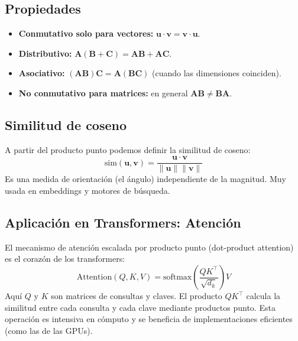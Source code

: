 \documentclass[12pt,a4paper,openany,oneside]{book}
\begin{document}
\begin{center}
\end{center}

\subsection{Propiedades}
\begin{itemize}
    \item \textbf{Conmutativo solo para vectores:} $\mathbf{u}\cdot\mathbf{v} = \mathbf{v}\cdot\mathbf{u}$.
    \item \textbf{Distributivo:} $\mathbf{A}(\mathbf{B}+\mathbf{C}) = \mathbf{A}\mathbf{B} + \mathbf{A}\mathbf{C}$.
    \item \textbf{Asociativo:} $(\mathbf{A}\mathbf{B})\mathbf{C} = \mathbf{A}(\mathbf{B}\mathbf{C})$ (cuando las dimensiones coinciden).
    \item \textbf{No conmutativo para matrices:} en general $\mathbf{A}\mathbf{B} \neq \mathbf{B}\mathbf{A}$.
\end{itemize}

\subsection{Similitud de coseno}
A partir del producto punto podemos definir la similitud de coseno:
\begin{equation*}
\text{sim}(\mathbf{u},\mathbf{v}) = \frac{\mathbf{u} \cdot \mathbf{v}}{\|\mathbf{u}\| \|\mathbf{v}\|}
\end{equation*}
Es una medida de orientación (el ángulo) independiente de la magnitud. Muy usada en embeddings y motores de búsqueda.

\subsection{Aplicación en Transformers: Atención}
El mecanismo de atención escalada por producto punto (dot-product attention) es el corazón de los transformers:
\begin{equation*}
\text{Attention}(Q,K,V) = \text{softmax}\left(\frac{QK^\top}{\sqrt{d_k}}\right) V
\end{equation*}
Aquí $Q$ y $K$ son matrices de consultas y claves. El producto $QK^\top$ calcula la similitud entre cada consulta y cada clave mediante productos punto. Esta operación es intensiva en cómputo y se beneficia de implementaciones eficientes (como las de las GPUs).
\end{document}
